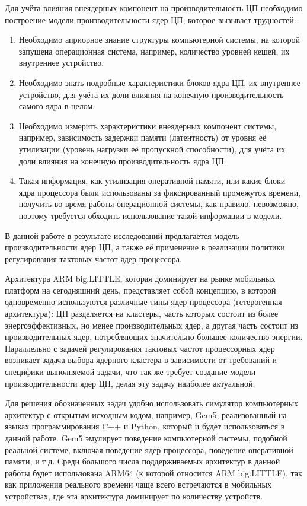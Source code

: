     Для учёта влияния внеядерных компонент на производительность ЦП необходимо построение
    модели производительности ядер ЦП, которое вызывает трудностей:
    \begin{enumerate}
        \item Необходимо априорное знание структуры компьютерной системы, на которой запущена
        операционная система, например, количество уровней кешей, их внутреннее устройство.
        \item Необходимо знать подробные характеристики блоков ядра ЦП, их внутреннее устройство, для
        учёта их доли влияния на конечную производительность самого ядра в целом.
        \item Необходимо измерить характеристики внеядерных компонент системы,
        например, зависимость задержки памяти (латентность) от уровня её утилизации (уровень
        нагрузки её пропускной способности), для учёта их доли влияния на конечную
        производительность ядра ЦП.
        \item Такая информация, как утилизация оперативной памяти, или какие блоки ядра процессора
        были использованы за фиксированный промежуток времени, получить во время работы операционной
        системы, как правило, невозможно, поэтому требуется обходить использование такой информации
        в модели.
    \end{enumerate}

    В данной работе в результате исследований предлагается модель производительности ядер ЦП, а также
    её применение в реализации политики регулирования тактовых частот ядер процессора.

    Архитектура ARM big.LITTLE, которая доминирует на рынке
    мобильных платформ на сегодняшний день, представляет собой концепцию, в которой одновременно
    используются различные типы ядер процессора (гетерогенная архитектура): ЦП разделяется на
    кластеры, часть которых состоит из более энергоэффективных, но менее производительных ядер,
    а другая часть состоит из производительных ядер, потребляющих значительно большее
    количество энергии. Параллельно с задачей регулирования тактовых частот
    процессорных ядер возникает задача выбора ядерного кластера в зависимости от требований и
    специфики выполняемой задачи, что так же требует создание модели производительности ядер ЦП,
    делая эту задачу наиболее актуальной.

    Для решения обозначенных задач удобно использовать симулятор компьютерных
    архитектур с открытым исходным кодом, например, Gem5, реализованный на языках программирования
    C++ и Python, который и будет использоваться в
    данной работе. Gem5 эмулирует поведение компьютерной системы, подобной реальной системе,
    включая поведение ядер процессора, поведение оперативной памяти, и т.д. Среди большого числа
    поддерживаемых архитектур в данной работы будет использована ARM64 (к которой относится
    ARM big.LITTLE), так как приложения реального времени чаще всего встречаются в мобильных устройствах,
    где эта архитектура доминирует по количеству устройств.

